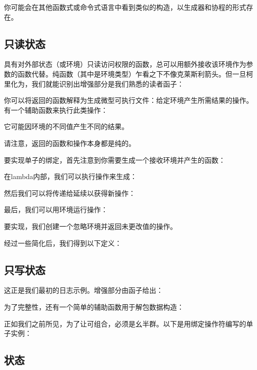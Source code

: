 你可能会在其他函数式或命令式语言中看到类似的构造，以生成器和协程的形式存在。

\subsection{只读状态}

具有对外部状态（或环境）只读访问权限的函数，总可以用额外接收该环境作为参数的函数代替。纯函数（其中是环境类型）乍看之下不像克莱斯利箭头。但一旦柯里化为，我们就能识别出增强部分是我们熟悉的读者函子：

你可以将返回的函数解释为生成微型可执行文件：给定环境产生所需结果的操作。有一个辅助函数来执行此类操作：

它可能因环境的不同值产生不同的结果。

请注意，返回的函数和操作本身都是纯的。

要实现单子的绑定，首先注意到你需要生成一个接收环境并产生的函数：

在lambda内部，我们可以执行操作来生成：

然后我们可以将传递给延续以获得新操作：

最后，我们可以用环境运行操作：

要实现，我们创建一个忽略环境并返回未更改值的操作。

经过一些简化后，我们得到以下定义：


\subsection{只写状态}

这正是我们最初的日志示例。增强部分由函子给出：

为了完整性，还有一个简单的辅助函数用于解包数据构造：

正如我们之前所见，为了让可组合，必须是幺半群。以下是用绑定操作符编写的单子实例：


\subsection{状态}


